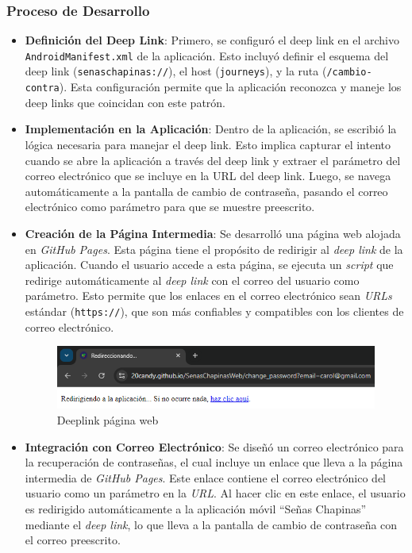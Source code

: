 \subsubsection*{Proceso de Desarrollo}
\begin{itemize}
    \item \textbf{Definición del Deep Link}: Primero, se configuró el deep link en el archivo \texttt{AndroidManifest.xml} de la aplicación. Esto incluyó definir el esquema del deep link (\texttt{senaschapinas://}), el host (\texttt{journeys}), y la ruta (\texttt{/cambio-contra}). Esta configuración permite que la aplicación reconozca y maneje los deep links que coincidan con este patrón.
    
    \item \textbf{Implementación en la Aplicación}: Dentro de la aplicación, se escribió la lógica necesaria para manejar el deep link. Esto implica capturar el intento cuando se abre la aplicación a través del deep link y extraer el parámetro del correo electrónico que se incluye en la URL del deep link. Luego, se navega automáticamente a la pantalla de cambio de contraseña, pasando el correo electrónico como parámetro para que se muestre preescrito.
    
    \item \textbf{Creación de la Página Intermedia}: Se desarrolló una página web alojada en\textit{ GitHub Pages}. Esta página tiene el propósito de redirigir al \textit{deep link} de la aplicación. Cuando el usuario accede a esta página, se ejecuta un \textit{script} que redirige automáticamente al \textit{ deep link} con el correo del usuario como parámetro. Esto permite que los enlaces en el correo electrónico sean \textit{URLs} estándar (\texttt{https://}), que son más confiables y compatibles con los clientes de correo electrónico.

        \begin{figure} [H]
            \centering
            \includegraphics[width=0.5\linewidth]{figuras/pagina_web_deeplink.png}
            \caption{Deeplink página web}
            \label{fig:enter-label}
        \end{figure}
        
    
    \item \textbf{Integración con Correo Electrónico}: Se diseñó un correo electrónico para la recuperación de contraseñas, el cual incluye un enlace que lleva a la página intermedia de \textit{GitHub Pages}. Este enlace contiene el correo electrónico del usuario como un parámetro en la \textit{URL}. Al hacer clic en este enlace, el usuario es redirigido automáticamente a la aplicación móvil ``Señas Chapinas'' mediante el \textit{deep link}, lo que lleva a la pantalla de cambio de contraseña con el correo preescrito.
           

\end{itemize}
